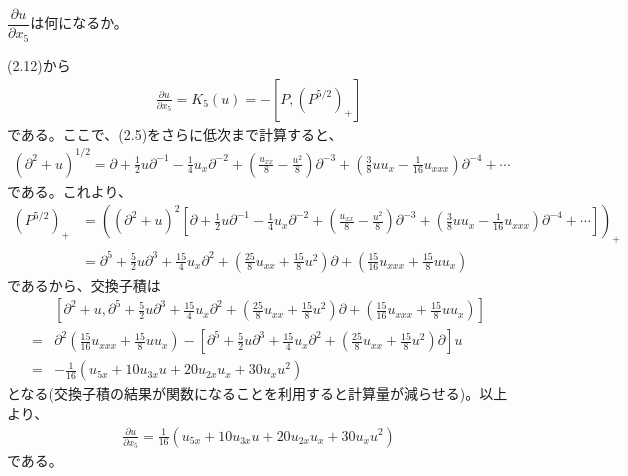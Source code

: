 \documentclass{jsarticle}
\begin{document}
\subsection{}
\begin{shaded}
$\dfrac{\partial u}{\partial x_{5}}$は何になるか。
\end{shaded}
(2.12)から
\begin{align}
\frac{\partial u}{\partial x_{5}}=K_{5}(u)=-[P,(P^{5/2})_{+}]
\end{align}
である。ここで、(2.5)をさらに低次まで計算すると、
\begin{align*}
(\partial^{2}+u)^{1/2}=\partial+\frac{1}{2}u\partial^{-1}-\frac{1}{4}u_{x}\partial^{-2}+\left(\frac{u_{xx}}{8}-\frac{u^{2}}{8}\right)\partial^{-3}+\left(\frac{3}{8}uu_{x}-\frac{1}{16}u_{xxx}\right)\partial^{-4}+\cdots
\end{align*}
である。これより、
\begin{align*}
\left(P^{5/2}\right)_{+}&=\left((\partial^{2}+u)^{2}\left[\partial+\frac{1}{2}u\partial^{-1}-\frac{1}{4}u_{x}\partial^{-2}+\left(\frac{u_{xx}}{8}-\frac{u^{2}}{8}\right)\partial^{-3}+\left(\frac{3}{8}uu_{x}-\frac{1}{16}u_{xxx}\right)\partial^{-4}+\cdots\right]\right)_{+}\\
&=\partial^{5}+\frac{5}{2}u\partial^{3}+\frac{15}{4}u_{x}\partial^{2}+\left(\frac{25}{8}u_{xx}+\frac{15}{8}u^{2}\right)\partial+\left(\frac{15}{16}u_{xxx}+\frac{15}{8}uu_{x}\right)
\end{align*}
であるから、交換子積は
\begin{align*}
&\left[\partial^{2}+u,\partial^{5}+\frac{5}{2}u\partial^{3}+\frac{15}{4}u_{x}\partial^{2}+\left(\frac{25}{8}u_{xx}+\frac{15}{8}u^{2}\right)\partial+\left(\frac{15}{16}u_{xxx}+\frac{15}{8}uu_{x}\right)\right]\\
=&\partial^{2}\left(\frac{15}{16}u_{xxx}+\frac{15}{8}uu_{x}\right)
-\left[\partial^{5}+\frac{5}{2}u\partial^{3}+\frac{15}{4}u_{x}\partial^{2}+\left(\frac{25}{8}u_{xx}+\frac{15}{8}u^{2}\right)\partial\right]u\\
=&-\frac{1}{16}(u_{5x}+10u_{3x}u+20u_{2x}u_{x}+30u_{x}u^{2})
\end{align*}
となる(交換子積の結果が関数になることを利用すると計算量が減らせる)。以上より、
\begin{align}
\frac{\partial u}{\partial x_{5}}=\frac{1}{16}(u_{5x}+10u_{3x}u+20u_{2x}u_{x}+30u_{x}u^{2})
\end{align}
である。
\end{document}
